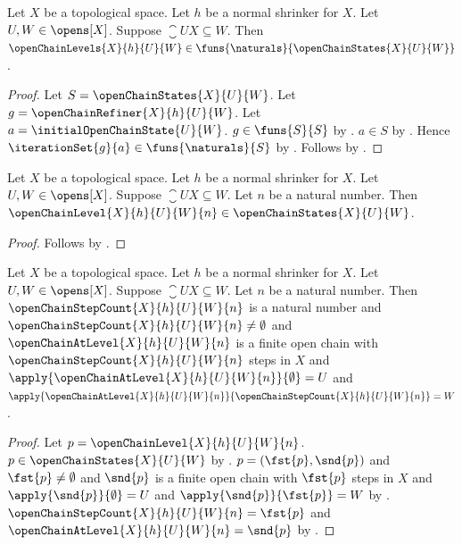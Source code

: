 \begin{theorem}\label{open_chain_levels_typed}
    Let $X$ be a topological space.
    Let $h$ be a normal shrinker for $X$.
    Let $U,W\in\opens[X]$.
    Suppose $\closure{U}{X}\subseteq W$.
    Then $\openChainLevels{X}{h}{U}{W}
        \in\funs{\naturals}{\openChainStates{X}{U}{W}}$.
\end{theorem}
\begin{proof}
    Let $S=\openChainStates{X}{U}{W}$.
    Let $g=\openChainRefiner{X}{h}{U}{W}$.
    Let $a=\initialOpenChainState{U}{W}$.
    $g\in\funs{S}{S}$ by .
    $a\in S$ by .
    Hence $\iterationSet{g}{a}\in\funs{\naturals}{S}$
        by .
    Follows by .
\end{proof}

\begin{corollary}\label{open_chain_level_is_state}
    Let $X$ be a topological space.
    Let $h$ be a normal shrinker for $X$.
    Let $U,W\in\opens[X]$.
    Suppose $\closure{U}{X}\subseteq W$.
    Let $n$ be a natural number.
    Then $\openChainLevel{X}{h}{U}{W}{n}
        \in\openChainStates{X}{U}{W}$.
\end{corollary}
\begin{proof}
    Follows by
        .
\end{proof}

\begin{corollary}\label{open_chain_level_components}
    Let $X$ be a topological space.
    Let $h$ be a normal shrinker for $X$.
    Let $U,W\in\opens[X]$.
    Suppose $\closure{U}{X}\subseteq W$.
    Let $n$ be a natural number.
    Then $\openChainStepCount{X}{h}{U}{W}{n}$ is a natural number and
        $\openChainStepCount{X}{h}{U}{W}{n}\neq\emptyset$ and
        $\openChainAtLevel{X}{h}{U}{W}{n}$ is a finite open chain with
            $\openChainStepCount{X}{h}{U}{W}{n}$ steps in $X$ and
        $\apply{\openChainAtLevel{X}{h}{U}{W}{n}}{\emptyset}=U$ and
        $\apply{\openChainAtLevel{X}{h}{U}{W}{n}}
            {\openChainStepCount{X}{h}{U}{W}{n}}=W$.
\end{corollary}
\begin{proof}
    Let $p=\openChainLevel{X}{h}{U}{W}{n}$.
    $p\in\openChainStates{X}{U}{W}$
        by .
    $p=(\fst{p},\snd{p})$ and $\fst{p}\neq\emptyset$ and
        $\snd{p}$ is a finite open chain with $\fst{p}$ steps in $X$ and
        $\apply{\snd{p}}{\emptyset}=U$ and
        $\apply{\snd{p}}{\fst{p}}=W$
        by .
    $\openChainStepCount{X}{h}{U}{W}{n}=\fst{p}$ and
        $\openChainAtLevel{X}{h}{U}{W}{n}=\snd{p}$
        by .
\end{proof}
